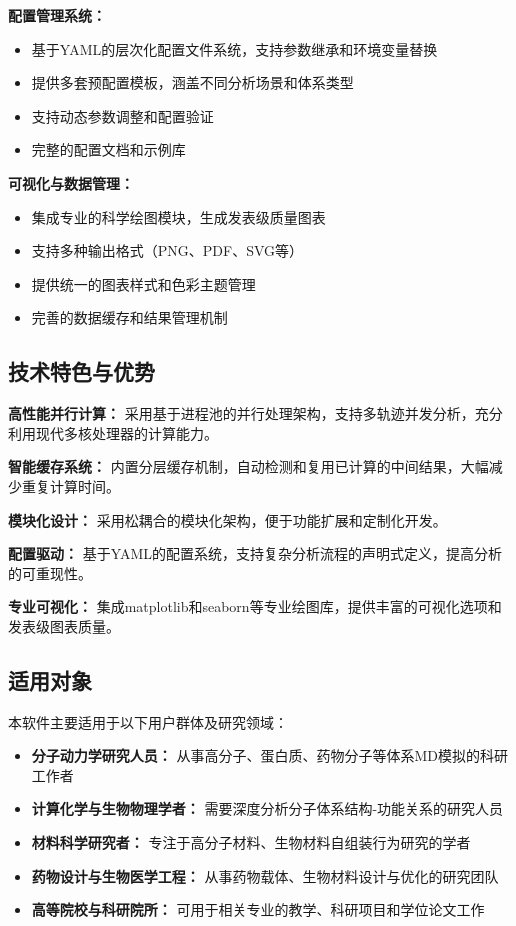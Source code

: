 \textbf{配置管理系统：}
\begin{itemize}
    \item 基于YAML的层次化配置文件系统，支持参数继承和环境变量替换
    \item 提供多套预配置模板，涵盖不同分析场景和体系类型
    \item 支持动态参数调整和配置验证
    \item 完整的配置文档和示例库
\end{itemize}

\textbf{可视化与数据管理：}
\begin{itemize}
    \item 集成专业的科学绘图模块，生成发表级质量图表
    \item 支持多种输出格式（PNG、PDF、SVG等）
    \item 提供统一的图表样式和色彩主题管理
    \item 完善的数据缓存和结果管理机制
\end{itemize}

\subsection{技术特色与优势}
\label{ssec:technical_features}

\textbf{高性能并行计算：} 采用基于进程池的并行处理架构，支持多轨迹并发分析，充分利用现代多核处理器的计算能力。

\textbf{智能缓存系统：} 内置分层缓存机制，自动检测和复用已计算的中间结果，大幅减少重复计算时间。

\textbf{模块化设计：} 采用松耦合的模块化架构，便于功能扩展和定制化开发。

\textbf{配置驱动：} 基于YAML的配置系统，支持复杂分析流程的声明式定义，提高分析的可重现性。

\textbf{专业可视化：} 集成matplotlib和seaborn等专业绘图库，提供丰富的可视化选项和发表级图表质量。

\subsection{适用对象}
\label{ssec:intro_target_audience}
本软件主要适用于以下用户群体及研究领域：

\begin{itemize}
    \item \textbf{分子动力学研究人员：} 从事高分子、蛋白质、药物分子等体系MD模拟的科研工作者
    \item \textbf{计算化学与生物物理学者：} 需要深度分析分子体系结构-功能关系的研究人员
    \item \textbf{材料科学研究者：} 专注于高分子材料、生物材料自组装行为研究的学者
    \item \textbf{药物设计与生物医学工程：} 从事药物载体、生物材料设计与优化的研究团队
    \item \textbf{高等院校与科研院所：} 可用于相关专业的教学、科研项目和学位论文工作
\end{itemize}

